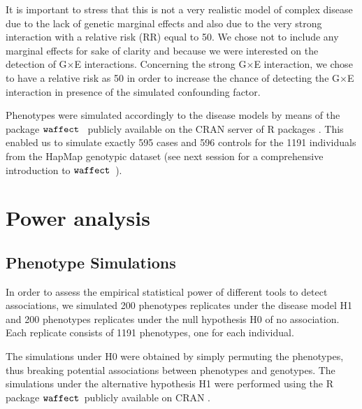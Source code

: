 \documentclass[10pt,a4paper]{article}
\newcommand{\waffect}{${\tt waffect}$\ }
\begin{document}
It is important to stress that this is not a very realistic model of complex disease due to the lack of genetic marginal effects and also due to the very strong interaction with a relative risk (RR) equal to 50. We chose not to include any marginal effects for sake of clarity and because we were interested on the detection of G$\times$E interactions. Concerning the strong G$\times$E interaction, we chose to have a relative risk as 50 in order to increase the chance of detecting the G$\times$E interaction in presence of the simulated confounding factor. 

Phenotypes were simulated accordingly to the disease models by means of the package \waffect \citep{perduca2012alternative} publicly available on the CRAN server of R packages \citep{R2013}. This enabled us to simulate exactly 595 cases and 596 controls for the 1191 individuals from the HapMap genotypic dataset (see next session for a comprehensive introduction to \waffect).

%

\section{Power analysis}

\subsection{Phenotype Simulations}

In order to assess the empirical statistical power of different tools to detect associations, we simulated 200 phenotypes replicates under the disease model H1 and 200 phenotypes replicates under the null hypothesis H0 of no association. Each replicate consists of 1191 phenotypes, one for each individual.

The simulations under H0 were obtained by simply permuting the phenotypes, thus breaking potential associations between phenotypes and genotypes. The simulations under the alternative hypothesis H1 were performed using the R package \waffect publicly available on CRAN \citep{perduca2012alternative}. 
\end{document}
